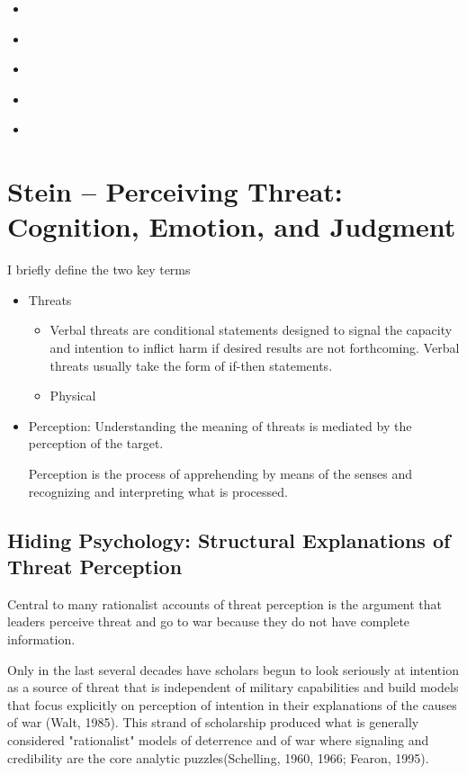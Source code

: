 \begin{itemize}
    \item [***] \textcite{levyForeignPolicyDecisionMaking2023}
    \item \textcite{steinPerceivingThreatCognition2023}
    \item \textcite{yarhi-miloEyeBeholderHow2013}
    \item \textcite{holmesPsychologicalLogicPeace2016}
    \item \textcite{kertzerPoliticalPsychologyInternational2018}
\end{itemize}

\section{Stein -- Perceiving Threat: Cognition, Emotion, and Judgment}
I briefly define the two key terms

\begin{itemize}
    \item Threats
    \begin{itemize}
        \item [(a)] Verbal threats are conditional statements designed to signal the capacity and intention to inflict harm if desired results are not forthcoming.
        Verbal threats usually take the form of if-then statements.
        \item [(b)] Physical
    \end{itemize}
    \item Perception: Understanding the meaning of threats is mediated by the perception of the target.
    
    Perception is the process of apprehending by means of the senses and recognizing and interpreting what is processed.
\end{itemize}

\subsection{Hiding Psychology: Structural Explanations of Threat Perception}

Central to many rationalist accounts of threat perception is the argument that leaders perceive threat and go to
war because they do not have complete information.

Only in the last several decades have scholars begun to look seriously at intention as a source of threat that is independent of military capabilities and build models that focus explicitly on perception of intention in their explanations of the causes of war (Walt, 1985). This strand of scholarship produced what is generally considered "rationalist" models of deterrence and of war where signaling and credibility are the core analytic puzzles(Schelling, 1960, 1966; Fearon, 1995).

